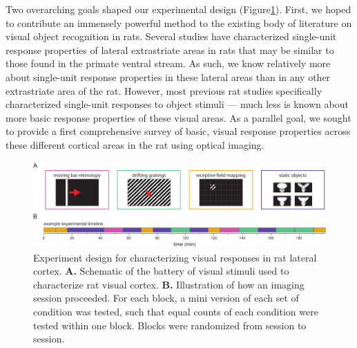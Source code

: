 Two overarching goals shaped our experimental design (Figure\ref{fig:experiment_design}). First, we hoped to contribute an immensely powerful method to the existing body of literature on visual object recognition in rats. Several studies have characterized single-unit response properties of lateral extrastriate areas in rats that may be similar to those found in the primate ventral stream\cite{Tafazoli2017, Vermaercke2014, Vermaercke2015NeuralDiscriminability}. As such, we know relatively more about single-unit response properties in these lateral areas than in any other extrastriate area of the rat. However, most previous rat studies specifically characterized single-unit responses to object stimuli --- much less is known about more basic response properties of these visual areas. As a parallel goal, we sought to provide a first comprehensive survey of basic, visual response properties across these different cortical areas in the rat using optical imaging. 

\begin{figure}
    \includegraphics[width=\textwidth]{figures/chapter_3/fig_3-1_experiment_design/fig_3-1_experiment_design.pdf}
    \vspace{.1in}
    \caption[Experiment design]{Experiment design for characterizing visual responses in rat lateral cortex. 
    \textbf{A.} Schematic of the battery of visual stimuli used to characterize rat visual cortex. 
    \textbf{B.} Illustration of how an imaging session proceeded. For each block, a mini version of each set of condition was tested, such that equal counts of each condition were tested within one block. Blocks were randomized from session to session. 
    \label{fig:experiment_design}}
\end{figure}


